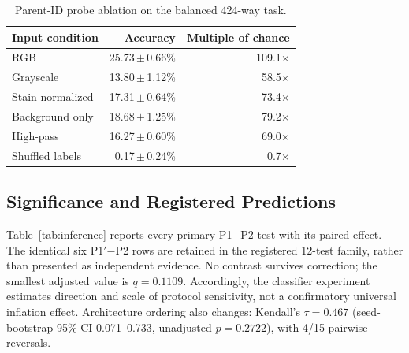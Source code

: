 \documentclass[conference]{IEEEtran}
\newcommand{\meanpm}[2]{#1\,$\pm$\,#2}
\newcommand{\protocol}[1]{\textsf{#1}}
\begin{document}
\begin{table}[t]
\caption{Parent-ID probe ablation on the balanced 424-way task.}
\label{tab:probe}
\centering
\scriptsize
\setlength{\tabcolsep}{4.2pt}
\begin{tabular}{lrr}
\toprule
Input condition & Accuracy & Multiple of chance \\
\midrule
RGB & \meanpm{25.73}{0.66}\% & 109.1$\times$ \\
Grayscale & \meanpm{13.80}{1.12}\% & 58.5$\times$ \\
Stain-normalized & \meanpm{17.31}{0.64}\% & 73.4$\times$ \\
Background only & \meanpm{18.68}{1.25}\% & 79.2$\times$ \\
High-pass & \meanpm{16.27}{0.60}\% & 69.0$\times$ \\
Shuffled labels & \meanpm{0.17}{0.24}\% & 0.7$\times$ \\
\bottomrule
\end{tabular}
\end{table}

\subsection{Significance and Registered Predictions}
Table~\ref{tab:inference} reports every primary \protocol{P1}$-$\protocol{P2} test with its paired effect.
The identical six \protocol{P1$'$}$-$\protocol{P2} rows are retained in the registered 12-test family, rather than presented as independent evidence.
No contrast survives correction; the smallest adjusted value is $q=0.1109$.
Accordingly, the classifier experiment estimates direction and scale of protocol sensitivity, not a confirmatory universal inflation effect.
Architecture ordering also changes: Kendall's $\tau=0.467$ (seed-bootstrap 95\% CI 0.071--0.733, unadjusted $p=0.2722$), with 4/15 pairwise reversals.
\end{document}
